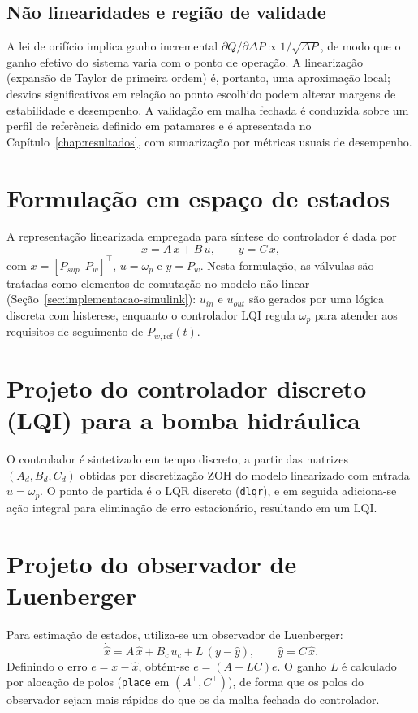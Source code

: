 \subsection{Não linearidades e região de validade}
A lei de orifício implica ganho incremental $\partial Q/\partial \Delta P \propto 1/\sqrt{\Delta P}$, de modo que o ganho efetivo do sistema varia com o ponto de operação. A linearização (expansão de Taylor de primeira ordem) é, portanto, uma aproximação local; desvios significativos em relação ao ponto escolhido podem alterar margens de estabilidade e desempenho. A validação em malha fechada é conduzida sobre um perfil de referência definido em patamares e é apresentada no Capítulo~\ref{chap:resultados}, com sumarização por métricas usuais de desempenho.
\section{Formulação em espaço de estados}
\label{sec:controle-formulacao-espaço-estados}
A representação linearizada empregada para síntese do controlador é dada por
\[
    \dot{x} = A\,x + B\,u, \qquad y = C\,x,
\]
com $x=[P_{sup}\ \ P_w]^\top$, $u=\omega_p$ e $y=P_w$. Nesta formulação, as válvulas são tratadas como elementos de comutação no modelo não linear (Seção~\ref{sec:implementacao-simulink}): $u_{in}$ e $u_{out}$ são gerados por uma lógica discreta com histerese, enquanto o controlador LQI regula $\omega_p$ para atender aos requisitos de seguimento de $P_{w,\text{ref}}(t)$.
\section{Projeto do controlador discreto (LQI) para a bomba hidráulica}
\label{sec:controle-lqr-luenberger}
O controlador é sintetizado em tempo discreto, a partir das matrizes $(A_d,B_d,C_d)$ obtidas por discretização ZOH do modelo linearizado com entrada $u=\omega_p$. O ponto de partida é o LQR discreto (\texttt{dlqr}), e em seguida adiciona-se ação integral para eliminação de erro estacionário, resultando em um LQI.
\section{Projeto do observador de Luenberger}
\label{sec:projeto-observador-luenberger}
Para estimação de estados, utiliza-se um observador de Luenberger:
\[
    \dot{\hat{x}} = A\,\hat{x} + B_c\,u_c + L\,(y-\hat{y}),
    \qquad \hat{y}=C\,\hat{x}.
\]
Definindo o erro $e=x-\hat{x}$, obtém-se $\dot{e}=(A-LC)e$. O ganho $L$ é calculado por alocação de polos (\texttt{place} em $(A^\top,C^\top)$), de forma que os polos do observador sejam mais rápidos do que os da malha fechada do controlador.

